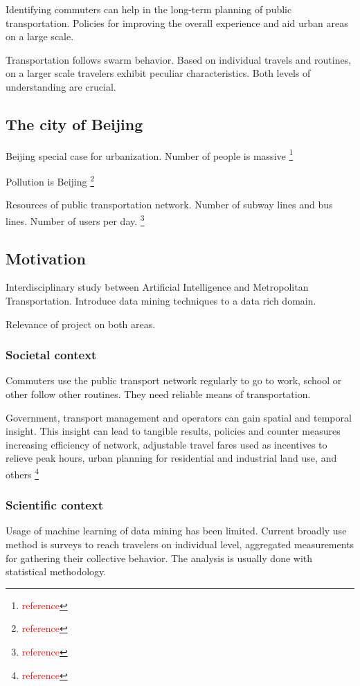 \documentclass{article}
\newcommand{\selfnote}[1]{\footnote{\textcolor{red}{#1}}}
\begin{document}
Identifying commuters can help in the long-term planning of public transportation. Policies for improving the overall experience and aid urban areas on a large scale.

Transportation follows swarm behavior. Based on individual travels and routines, on a larger scale travelers exhibit peculiar characteristics. Both levels of understanding are crucial.   

\subsection{The city of Beijing}
Beijing special case for urbanization. Number of people is massive \selfnote{reference}

Pollution is Beijing \selfnote{reference}

Resources of public transportation network. Number of subway lines and bus lines. Number of users per day. \selfnote{reference}

\subsection{Motivation}
Interdisciplinary study between Artificial Intelligence and Metropolitan Transportation. Introduce data mining techniques to a data rich domain. 

Relevance of project on both areas. 

\subsubsection{Societal context}
Commuters use the public transport network regularly to go to work, school or other follow other routines. They need reliable means of transportation.

Government, transport management and operators can gain spatial and temporal insight. This insight can lead to tangible results, policies and counter measures increasing efficiency of network, adjustable travel fares used as incentives to relieve peak hours, urban planning for residential and industrial land use, and others \selfnote{reference}

\subsubsection{Scientific context}
Usage of machine learning of data mining has been limited. Current broadly use method is surveys to reach travelers on individual level, aggregated measurements for gathering  their collective behavior. The analysis is usually done with statistical methodology. 
\end{document}
